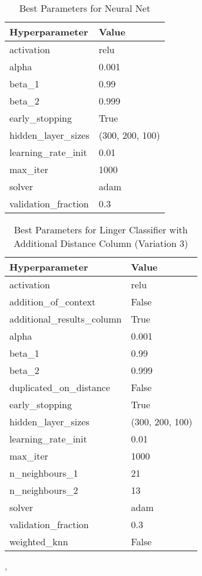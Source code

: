 \documentclass[a4paper, 12pt]{report}
\begin{document}
\begin{table}[H]
    \centering
    \caption{Best Parameters for Neural Net}
    \label{tab:best_parameters_neural_net_LCV3_Glass}
    \begin{tabular}{|l|l|}
    \hline
    \textbf{Hyperparameter} & \textbf{Value} \\ \hline
    activation & relu \\ \hline
    alpha & 0.001 \\ \hline
    beta\_1 & 0.99 \\ \hline
    beta\_2 & 0.999 \\ \hline
    early\_stopping & True \\ \hline
    hidden\_layer\_sizes & (300, 200, 100) \\ \hline
    learning\_rate\_init & 0.01 \\ \hline
    max\_iter & 1000 \\ \hline
    solver & adam \\ \hline
    validation\_fraction & 0.3 \\ \hline
    \end{tabular}
\end{table}

\begin{table}[H]
    \centering
    \caption{Best Parameters for Linger Classifier with Additional Distance Column (Variation 3)}
    \label{tab:best_parameters_linger_classifier_LCV3_Glass}
    \begin{tabular}{|l|l|}
    \hline
    \textbf{Hyperparameter} & \textbf{Value} \\ \hline
    activation & relu \\ \hline
    addition\_of\_context & False \\ \hline
    additional\_results\_column & True \\ \hline
    alpha & 0.001 \\ \hline
    beta\_1 & 0.99 \\ \hline
    beta\_2 & 0.999 \\ \hline
    duplicated\_on\_distance & False \\ \hline
    early\_stopping & True \\ \hline
    hidden\_layer\_sizes & (300, 200, 100) \\ \hline
    learning\_rate\_init & 0.01 \\ \hline
    max\_iter & 1000 \\ \hline
    n\_neighbours\_1 & 21 \\ \hline
    n\_neighbours\_2 & 13 \\ \hline
    solver & adam \\ \hline
    validation\_fraction & 0.3 \\ \hline
    weighted\_knn & False \\ \hline
    \end{tabular}, 
\end{table}
\end{document}
